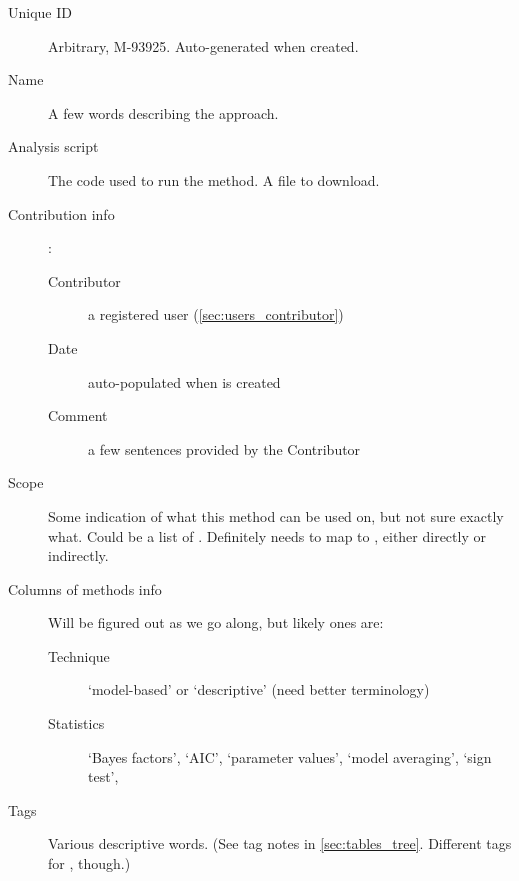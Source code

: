 \begin{description}
    \item[Unique ID] Arbitrary, \eg M-93925.  Auto-generated when created.
    \item[Name] A few words describing the approach. %
    \item[Analysis script] The code used to run the method.  A file to download.
    \item[Contribution info]:
        \begin{description}
            \item[Contributor] a registered user (\cref{sec:users_contributor})
            \item[Date] auto-populated when \Method is created
            \item[Comment] a few sentences provided by the Contributor
        \end{description}
    \item[Scope] Some indication of what this method can be used on, but not sure exactly what.
            Could be a list of \Refsets.  Definitely needs to map to \Tasks, either directly or indirectly.
    \item[Columns of methods info] Will be figured out as we go along, but likely ones are:
        \begin{description}
            \item [Technique] `model-based' or `descriptive' (need better terminology)
            \item [Statistics] `Bayes factors', `AIC', `parameter values', `model averaging', `sign test', \etc
        \end{description}
    \item [Tags] Various descriptive words. %
            (See tag notes in \cref{sec:tables_tree}.  Different tags for \Methods, though.)
\end{description}

